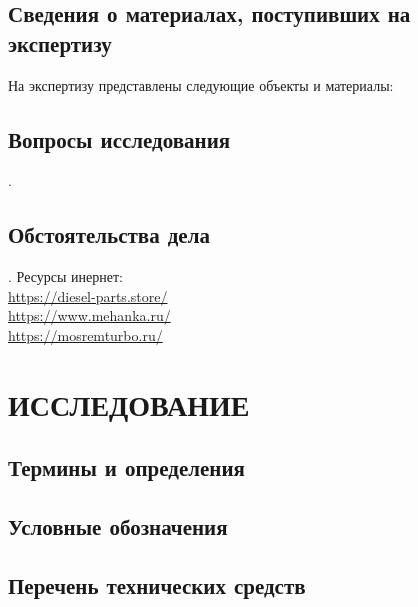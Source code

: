 


	








\thispagestyle{empty}  %


\subsection{Сведения  о материалах, поступивших на экспертизу}
На экспертизу представлены следующие объекты и материалы:



\subsection{Вопросы исследования}.


\subsection{Обстоятельства дела}


. Ресурсы инернет:\\
\url{https://diesel-parts.store/}\\
\url{https://www.mehanka.ru/}\\
\url{https://mosremturbo.ru/}


\section{ИССЛЕДОВАНИЕ}

\subsection{Термины и определения}


\subsection{Условные обозначения}


\subsection{Перечень технических средств}


